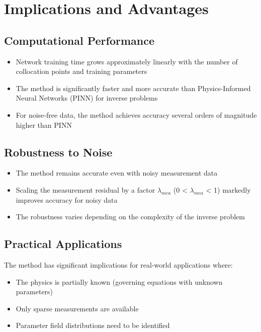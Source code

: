 \documentclass[11pt,a4paper]{article}
\begin{document}
\section{Implications and Advantages}

\subsection{Computational Performance}

\begin{itemize}
    \item Network training time grows approximately linearly with the number of collocation points and training parameters
    \item The method is significantly faster and more accurate than Physics-Informed Neural Networks (PINN) for inverse problems
    \item For noise-free data, the method achieves accuracy several orders of magnitude higher than PINN
\end{itemize}

\subsection{Robustness to Noise}

\begin{itemize}
    \item The method remains accurate even with noisy measurement data
    \item Scaling the measurement residual by a factor $\lambda_{mea}$ (0 < $\lambda_{mea}$ < 1) markedly improves accuracy for noisy data
    \item The robustness varies depending on the complexity of the inverse problem
\end{itemize}

\subsection{Practical Applications}

The method has significant implications for real-world applications where:
\begin{itemize}
    \item The physics is partially known (governing equations with unknown parameters)
    \item Only sparse measurements are available
    \item Parameter field distributions need to be identified
\end{itemize}
\end{document}
